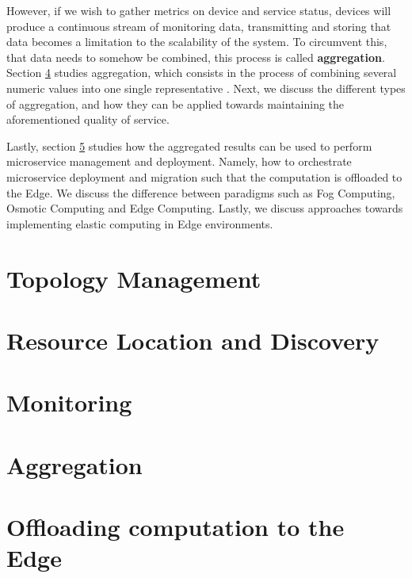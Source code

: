 However, if we wish to gather metrics on device and service status, devices will produce a continuous stream of monitoring data, transmitting and storing that data becomes a limitation to the scalability of the system. To circumvent this, that data needs to somehow be combined, this process is called \textbf{aggregation}. Section \ref{sec:aggregation} studies aggregation, which consists in the process of combining several numeric values into one single representative \cite{grabisch2009aggregation}. Next, we discuss the different types of aggregation, and how they can be applied towards maintaining the aforementioned quality of service.

Lastly, section \ref{sec:offloading_computation} studies how the aggregated results can be used to perform microservice management and deployment. Namely, how to orchestrate microservice deployment and migration such that the computation is offloaded to the Edge. We discuss the difference between paradigms such as Fog Computing, Osmotic Computing and Edge Computing. Lastly, we discuss approaches towards implementing elastic computing in Edge environments.

\section{Topology Management} \label{sec:topology_management} 

\section{Resource Location and Discovery} \label{sec:res_location} 

\section{Monitoring} \label{sec:res_monitoring} 

\section{Aggregation} \label{sec:aggregation} 

\section{Offloading computation to the Edge} \label{sec:offloading_computation} 

